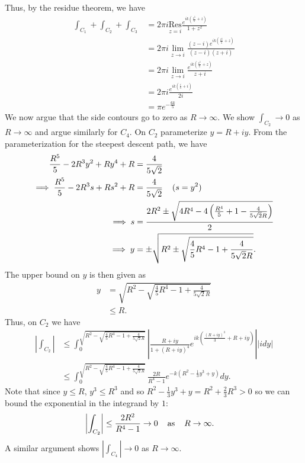 \documentclass{article}
\newcommand{\res}[1]{\underset{z = #1}{\text{Res}}}
\begin{document}
\begin{itemize}
\begin{itemize}
        Thus, by the residue theorem, we have
        \begin{align*}
        \int_{C_1} + \int_{C_2} + \int_{C_3} &= 2\pi i \res{i}\frac{e^{ik\left(\frac{z^5}{5} + z\right)}}{1 + z^2}\\
        &= 2\pi i \lim_{z \to i}\frac{(z - i)e^{ik\left(\frac{z^5}{5} + z\right)}}{(z - i)(z + i)}\\
        &= 2\pi i \lim_{z \to i}\frac{e^{ik\left(\frac{z^5}{5} + z\right)}}{z + i}\\
        &= 2\pi i\frac{e^{ik\left(\frac{i}{5} + i\right)}}{2i}\\
        &= \pi e^{-\frac{6k}{5}}
        \end{align*}
        We now argue that the side contours go to zero as $R \to \infty$. We show $\int_{C_2} \to 0$ as $R \to \infty$ and argue similarly for $C_4$. On $C_2$ parameterize $y = R + iy$. From the parameterization for the steepest descent path, we have
        \begin{align*}
            \frac{R^5}{5} - 2R^3y^2 + Ry^4 + R &= \frac{4}{5\sqrt{2}}\\
            \implies \frac{R^5}{5} - 2R^3s + Rs^2 + R &= \frac{4}{5\sqrt{2}} \hspace{0.4cm} (s = y^2)\\
            \implies s &= \frac{2R^2 \pm \sqrt{4R^4 - 4\left(\frac{R^4}{5} + 1 - \frac{4}{5\sqrt{2}R}\right)}}{2}\\
            \implies y &= \pm\sqrt{R^2 \pm \sqrt{\frac{4}{5}R^4 - 1 + \frac{4}{5\sqrt{2}R}}}.
        \end{align*}
        The upper bound on $y$ is then given as
        \begin{align*}
            y &= \sqrt{R^2 - \sqrt{\frac{4}{5}R^4 - 1 + \frac{4}{5\sqrt{2}R}}}\\
            &\leq R.
        \end{align*}
        Thus, on $C_2$ we have
        \begin{align*}
            \left|\int_{C_2}\right| &\leq \int_0^{\sqrt{R^2 - \sqrt{\frac{4}{5}R^4 - 1 + \frac{4}{5\sqrt{2}R}}}}\left|\frac{R + iy}{1 + (R+iy)^4}e^{ik\left(\frac{(R + iy)^3}{3} + R + iy\right)}\right||idy|\\
            &\leq \int_0^{\sqrt{R^2 - \sqrt{\frac{4}{5}R^4 - 1 + \frac{4}{5\sqrt{2}R}}}} \frac{2R}{R^4 - 1} e^{-k\left(R^2 - \frac{1}{3}y^3 + y\right)}dy.
        \end{align*}
        Note that since $y \leq R$, $y^3 \leq R^3$ and so $R^2 - \frac{1}{3}y^3 + y = R^2 + \frac{2}{3}R^3 > 0$ so we can bound the exponential in the integrand by $1$:
        \begin{align*}
            \left|\int_{C_2}\right| &\leq \frac{2R^2}{R^4 - 1} \to 0 \hspace{0.4cm} \text{as} \hspace{0.4cm} R \to \infty.
        \end{align*}
        A similar argument shows ${\displaystyle \left|\int_{C_4}\right| \to 0 }$ as $R \to \infty$.





\end{itemize}
\end{itemize}
\end{document}
